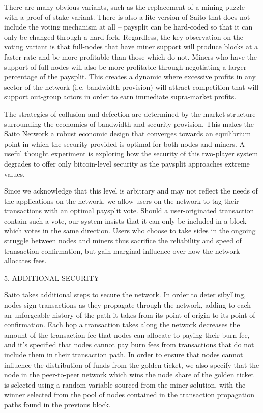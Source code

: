 \documentclass[11.5pt, oneside]{article}   	%
\begin{document}
\begin{multicols}{2}
There are many obvious variants, such as the replacement of a mining puzzle with a proof-of-stake variant. There is also a lite-version of Saito that does not include the voting mechanism at all -- paysplit can be hard-coded so that it can only be changed through a hard fork. Regardless, the key observation on the voting variant is that full-nodes that have miner support will produce blocks at a faster rate and be more profitable than those which do not. Miners who have the support of full-nodes will also be more profitable through negotiating a larger percentage of the paysplit. This creates a dynamic where excessive profits in any sector of the network (i.e. bandwidth provision) will attract competition that will support out-group actors in order to earn immediate supra-market profits. 

The strategies of collusion and defection are determined by the market structure surrounding the economics of bandwidth and security provision. This makes the Saito Network a robust economic design that converges towards an equilibrium point in which the security provided is optimal for both nodes and miners. A useful thought experiment is exploring how the security of this two-player system degrades to offer only bitcoin-level security as the paysplit approaches extreme values.

Since we acknowledge that this level is arbitrary and may not reflect the needs of the applications on the network, we allow users on the network to tag their transactions with an optimal paysplit vote. Should a user-originated transaction contain such a vote, our system insists that it can only be included in a block which votes in the same direction. Users who choose to take sides in the ongoing struggle between nodes and miners thus sacrifice the reliability and speed of transaction confirmation, but gain marginal influence over how the network allocates fees.

5. ADDITIONAL SECURITY

Saito takes additional steps to secure the network. In order to deter sibylling,  nodes sign transactions as they propagate through the network, adding to each an unforgeable history of the path it takes from its point of origin to its point of confirmation. Each hop a transaction takes along the network decreases the amount of the transaction fee that nodes can allocate to paying their burn fee, and it's specified that nodes cannot pay burn fees from transactions that do not include them in their transaction path. In order to ensure that nodes cannot influence the distribution of funds from the golden ticket, we also specify that the node in the peer-to-peer network which wins the node share of the golden ticket is selected using a random variable sourced from the miner solution, with the winner selected from the pool of nodes contained in the transaction propagation paths found in the previous block.


\end{multicols}
\end{document}
